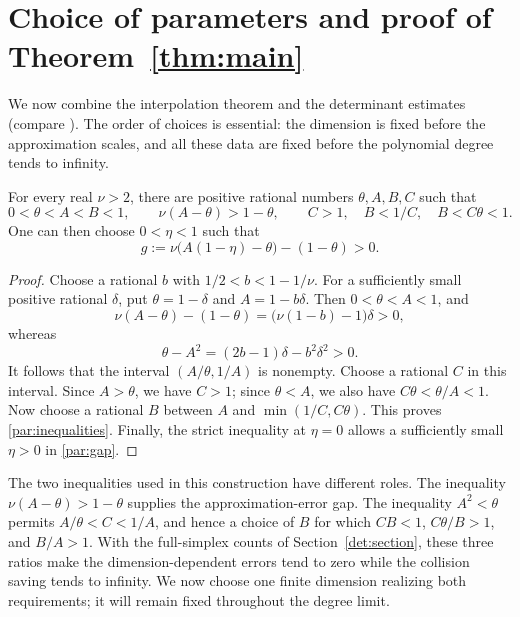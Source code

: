 \section{Choice of parameters and proof of Theorem~\ref{thm:main}}
\label{sec:parameters}

We now combine the interpolation theorem and the determinant estimates (compare \cite{laurent1991,waldschmidt2000}).
The order of choices is essential: the dimension is fixed before the
approximation scales, and all these data are fixed before the polynomial
degree tends to infinity.

\begin{lemma}\label{par:constants}
For every real \(\nu>2\), there are positive rational numbers
\(\theta,A,B,C\) such that
\begin{equation}\label{par:inequalities}
0<\theta<A<B<1,\qquad
\nu(A-\theta)>1-\theta,\qquad
C>1,\quad B<1/C,\quad B<C\theta<1.
\end{equation}
One can then choose \(0<\eta<1\) such that
\begin{equation}\label{par:gap}
g:=\nu\bigl(A(1-\eta)-\theta\bigr)-(1-\theta)>0.
\end{equation}
\end{lemma}

\begin{proof}
Choose a rational \(b\) with \(1/2<b<1-1/\nu\).
For a sufficiently small positive rational \(\delta\), put
\(\theta=1-\delta\) and \(A=1-b\delta\). Then \(0<\theta<A<1\), and
\[
\nu(A-\theta)-(1-\theta)
=\bigl(\nu(1-b)-1\bigr)\delta>0,
\]
whereas
\[
\theta-A^2=(2b-1)\delta-b^2\delta^2>0.
\]
It follows that the interval \((A/\theta,1/A)\) is nonempty.
Choose a rational \(C\) in this interval. Since \(A>\theta\), we have
\(C>1\); since \(\theta<A\), we also have
\(C\theta<\theta/A<1\).
Now choose a rational \(B\) between \(A\) and
\(\min(1/C,C\theta)\). This proves \eqref{par:inequalities}.
Finally, the strict inequality at \(\eta=0\) allows a sufficiently
small \(\eta>0\) in \eqref{par:gap}.
\end{proof}

The two inequalities used in this construction have different roles.
The inequality \(\nu(A-\theta)>1-\theta\) supplies the
approximation-error gap. The inequality \(A^2<\theta\) permits
\(A/\theta<C<1/A\), and hence a choice of \(B\) for which
\(CB<1\), \(C\theta/B>1\), and \(B/A>1\). With the full-simplex
counts of Section~\ref{det:section}, these three ratios make the
dimension-dependent errors tend to zero while the collision saving
tends to infinity. We now choose one finite dimension realizing
both requirements; it will remain fixed throughout the degree limit.

